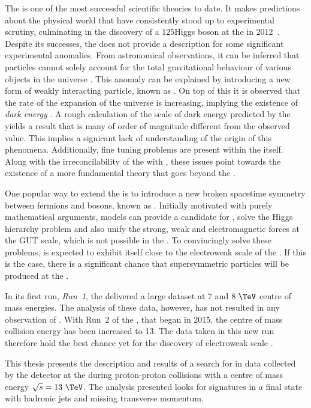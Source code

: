 The \SM is one of the most successful scientific theories to date. It
makes predictions about the physical world that have consistently
stood up to experimental scrutiny, culminating in the discovery of a
$125$\gev Higgs boson at the \LHC in
2012~\cite{1207.7214,1207.7235}.  Despite its successes, the \SM does
not provide a description for some significant experimental anomalies.
From astronomical observations, it can be inferred that \SM particles
cannot solely account for the total gravitational behaviour of various
objects in the universe
\cite{Kapteyn:1922zz,Oort:436532,Markevitch:2003at,2012Natur.487..202D,Ade:2015xua,0067-0049-180-2-225}.
This anomaly can be explained by introducing a new form of weakly
interacting particle, known as \emph{\DM}. On top of this it is
observed that the rate of the expansion of the universe is increasing,
implying the existence of \emph{dark energy}
\cite{Weinberg:1988cp,Riess:1998cb}.  A rough calculation of the scale
of dark energy predicted by the \SM yields a result that is many of
order of magnitude different from the observed value.  This implies a
signicant lack of understanding of the origin of this phenomena.
Additionally, fine tuning problems are present within the \SM itself.
Along with the irreconcilability of the \SM with \GR, these issues
point towards the existence of a more fundamental theory 
that goes beyond the \SM. 

One popular way to extend the \SM is to introduce a new broken
spacetime symmetry between fermions and bosons, known as \SUSY
\cite{Martin:1997ns}.  Initially motivated with purely mathematical
arguments, \SUSY models can provide a candidate for \DM, solve the
Higgs hierarchy problem and also unify the strong, weak and
electromagnetic forces at the \ac{GUT} scale, which is not possible
in the \SM. To convincingly solve these problems, \SUSY is expected to
exhibit itself close to the electroweak scale of the \SM. If this is
the case, there is a significant chance that supersymmetric particles
will be produced at the \LHC. %

In its first run, \emph{Run~1}, the \LHC delivered a large dataset at
$7$ and $8~\tev$ centre of mass energies. The analysis of these data,
however, has not resulted in any observation of \SUSY. With Run~2 of
the \LHC, that began in 2015, the centre of mass collision energy has
been increased to 13\tev. The data taken in this new run therefore
hold the best chance yet for the discovery of electroweak scale \SUSY.

This thesis presents the description and results of a search for \SUSY
in data collected by the \CMS detector at the \LHC during
proton-proton collisions with a centre of mass energy $\sqrt{s} =
13~\tev$.  The analysis presented looks for \SUSY signatures in a
final state with hadronic jets and missing transverse momentum. 

